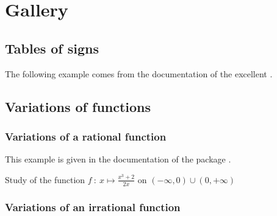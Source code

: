 \section{Gallery}
\subsection{Tables of signs}
The following example comes from the documentation of the excellent .


\medskip


\begin{tkzexample}
\end{tkzexample}


\subsection{Variations of functions}
 \subsubsection{Variations of a rational function}

 This example is given in the documentation of the package .

 Study of the function $f~:~ x \longmapsto \frac{x^3+2}{2x}$ on $(-\infty, 0) \cup (0, +\infty)$

\begin{tkzexample}
\end{tkzexample}


\subsubsection{Variations of an irrational function}

